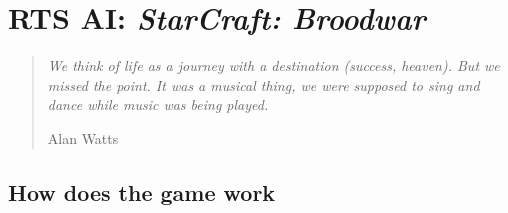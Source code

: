 \chapter{RTS AI: \textit{StarCraft: Broodwar}}
\chaptertoc

\begin{quotation}\textit{
We think of life as a journey with a destination (success, heaven). But we missed the point. It was a musical thing, we were supposed to sing and dance while music was being played.}\\
\begin{flushright}Alan Watts\end{flushright}
\end{quotation}

\section{How does the game work}

